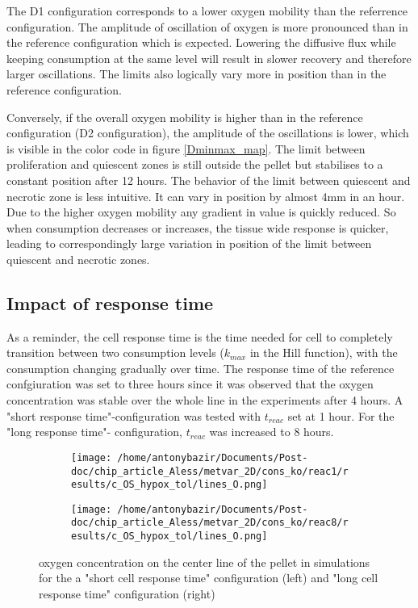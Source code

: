 \documentclass[11pt,a4paper]{article}
\begin{document}
The D1 configuration corresponds to a lower oxygen mobility than the referrence configuration. The amplitude of oscillation of oxygen is more pronounced than in the reference configuration which is expected. Lowering the diffusive flux while keeping consumption at the same level will result in slower recovery and therefore larger oscillations. The limits also logically vary more in position than in the reference configuration.

Conversely, if the  overall oxygen mobility is higher than in the reference configuration (D2 configuration), the amplitude of the oscillations is lower, which is visible in the color code in figure \ref{Dminmax_map}. The limit between proliferation and quiescent zones is still outside the pellet but stabilises to a constant position after 12 hours. The behavior of the limit between quiescent and necrotic zone is less intuitive. It can vary in position by almost 4mm in an hour. Due to the higher oxygen mobility any gradient in value is quickly reduced. So when consumption decreases or increases, the tissue wide response is quicker, leading to correspondingly large variation in position of the limit between quiescent and necrotic zones.  

\subsection{Impact of response time}
As a reminder, the cell response time is the time needed for cell to completely transition between two consumption levels ($k_{max}$ in the Hill function), with the consumption changing gradually over time. The response time of the reference confgiuration was set to three hours since it was observed that the oxygen concentration was stable over the whole line in the  experiments after 4 hours. A "short response time"-configuration was tested with $t_{reac}$ set at 1 hour. For the "long response time"- configuration, $t_{reac}$ was increased to 8 hours.


\begin{figure}[ht!]
\begin{subfigure}{0.44\textwidth}
	\centering
	\texttt{[image: /home/antonybazir/Documents/Post-doc/chip\_article\_Aless/metvar\_2D/cons\_ko/reac1/results/c\_OS\_hypox\_tol/lines\_O.png]}
\end{subfigure}
\begin{subfigure}{0.44\textwidth}
	\centering
	\texttt{[image: /home/antonybazir/Documents/Post-doc/chip\_article\_Aless/metvar\_2D/cons\_ko/reac8/results/c\_OS\_hypox\_tol/lines\_O.png]}
\end{subfigure}
\caption{oxygen concentration on the center line of the pellet in simulations for the a "short cell response time" configuration (left) and "long cell response time" configuration (right)  \label{reac_map}}
\end{figure}
\end{document}
